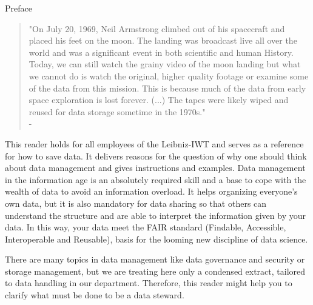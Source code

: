 \thispagestyle{empty}
\begin{center}
  \large\headerfont{}\textcolor{iwtdark}{Preface}
\end{center}

\begin{quote}
  "On July 20, 1969, Neil Armstrong climbed out of his spacecraft and
  placed his feet on the moon. The landing was broadcast live all over the
  world and was a significant event in both scientific and human History.
  Today, we can still watch the grainy video of the moon landing but what we
  cannot do is watch the original, higher quality footage or examine some of
  the data from this mission. This is because much of the data from early space
  exploration is lost forever. (...) The tapes were likely wiped and reused for
  data storage sometime in the 1970s." \\
  \null\hfill - \citeauthor{briney2015}\cite{briney2015}
\end{quote}

\noindent This reader holds for all employees of the Leibniz-IWT and serves as a reference
for how to save data. It delivers reasons for the question of why one should
think about data management and gives instructions and examples. Data management
in the information age is an absolutely required skill and a base to cope with
the wealth of data to avoid an information overload. It helps organizing
everyone’s own data, but it is also mandatory for data sharing so that others
can understand the structure and are able to interpret the information given by
your data. In this way, your data meet the FAIR standard (Findable, Accessible,
Interoperable and Reusable), basis for the looming new discipline of data science.

There are many topics in data management like data governance and security or
storage management, but we are treating here only a condensed extract, tailored
to data handling in our department. Therefore, this reader might help you to
clarify what must be done to be a data steward.
